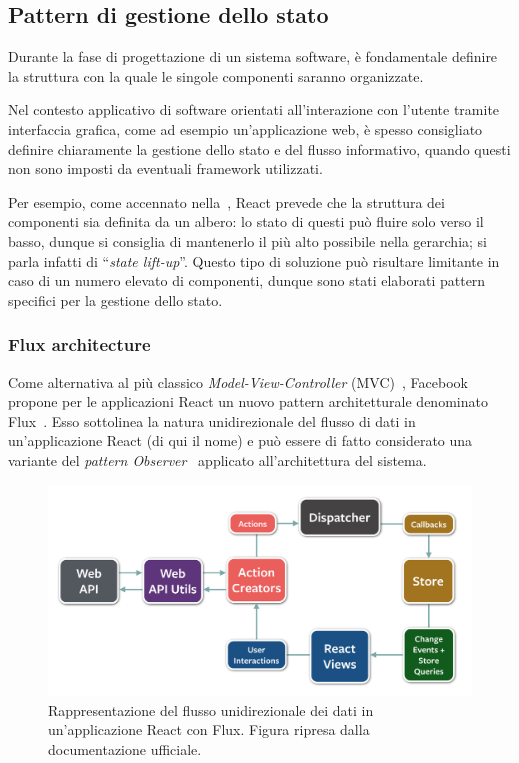 \subsection{Pattern di gestione dello stato}\label{subsec:state-manage}
  Durante la fase di progettazione di un sistema software, è fondamentale definire la struttura con la quale le singole componenti saranno organizzate.

  Nel contesto applicativo di software orientati all'interazione con l'utente tramite interfaccia grafica, come ad esempio un'applicazione web,
  è spesso consigliato definire chiaramente la gestione dello stato e del flusso informativo, quando questi non sono imposti da eventuali framework utilizzati.

  Per esempio, come accennato nella~, React prevede che la struttura dei componenti sia definita da un albero:
  lo stato di questi può fluire solo verso il basso, dunque si consiglia di mantenerlo il più alto possibile nella gerarchia;
  si parla infatti di ``\emph{state lift-up}''.
  Questo tipo di soluzione può risultare limitante in caso di un numero elevato di componenti, dunque sono stati elaborati pattern specifici per la gestione dello stato.

  \subsubsection{Flux architecture}
    Come alternativa al più classico \emph{Model-View-Controller} (MVC)~\cite{Reenskaug2003TheM},
    Facebook propone per le applicazioni React un nuovo pattern architetturale denominato Flux~\cite{10.1145/2742580.2742818}.
    Esso sottolinea la natura unidirezionale del flusso di dati in un'applicazione React (di qui il nome)
    e può essere di fatto considerato una variante del \emph{pattern Observer}~\cite{10.5555/186897} applicato all'architettura del sistema.

    \begin{figure}[htbp]
      \centering
      \includegraphics[width=.9\textwidth]{res/fig/flux-diagram-white-background.png}
      \caption[
        Rappresentazione del flusso unidirezionale dei dati in un'applicazione React con Flux.
      ]{
        Rappresentazione del flusso unidirezionale dei dati in un'applicazione React con Flux.
        Figura ripresa dalla documentazione ufficiale.
      }%
      \label{fig:flux}
    \end{figure}

